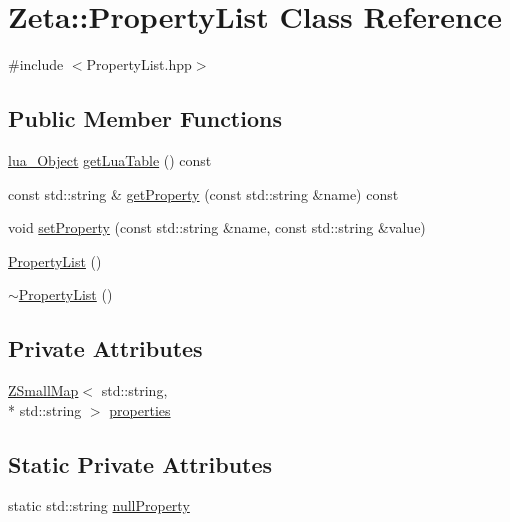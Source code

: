 \hypertarget{classZeta_1_1PropertyList}{\section{Zeta\+:\+:Property\+List Class Reference}
\label{classZeta_1_1PropertyList}
}


{\ttfamily \#include $<$Property\+List.\+hpp$>$}

\subsection*{Public Member Functions}
\begin{DoxyCompactItemize}
\item 
\hyperlink{ZetaConfig_8hpp_ae7be32b73848041a60f2412f72bbb221}{lua\+\_\+\+Object} \hyperlink{classZeta_1_1PropertyList_aae83e92d4a97ba9262351ac1fc2da306}{get\+Lua\+Table} () const 
\item 
const std\+::string \& \hyperlink{classZeta_1_1PropertyList_ac8bfe6232755a1971d3c3b59873e0dc9}{get\+Property} (const std\+::string \&name) const 
\item 
void \hyperlink{classZeta_1_1PropertyList_ad928d944ea5cc566b96451fe7ff314bf}{set\+Property} (const std\+::string \&name, const std\+::string \&value)
\item 
\hyperlink{classZeta_1_1PropertyList_ad8a54b1655e22ff048b68f782c0fa5c4}{Property\+List} ()
\item 
\hyperlink{classZeta_1_1PropertyList_add66a061171c6ea22b57f7de175c3862}{$\sim$\+Property\+List} ()
\end{DoxyCompactItemize}
\subsection*{Private Attributes}
\begin{DoxyCompactItemize}
\item 
\hyperlink{namespaceZeta_a4c11e23ddc559dccdb5e85901d7dfb84}{Z\+Small\+Map}$<$ std\+::string, \\*
std\+::string $>$ \hyperlink{classZeta_1_1PropertyList_aff0507b325954cc7419e4b6234a46a32}{properties}
\end{DoxyCompactItemize}
\subsection*{Static Private Attributes}
\begin{DoxyCompactItemize}
\item 
static std\+::string \hyperlink{classZeta_1_1PropertyList_a9b4b0e40bbe6e3f988a7c2c49574d0aa}{null\+Property}
\end{DoxyCompactItemize}


